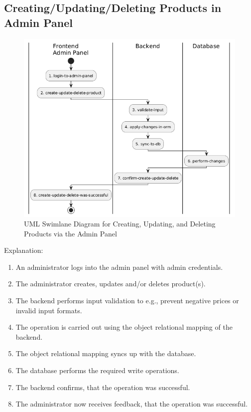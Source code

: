 \hypertarget{__runtime_scenario_3}{%
\subsection{Creating/Updating/Deleting Products in Admin Panel}\label{__runtime_scenario_3}}
\begin{figure}[h]
  \centering
  \includegraphics[width=\textwidth]{images/uml_swimlane_product_create_update_delete.png}
  \caption{UML Swimlane Diagram for Creating, Updating, and Deleting Products via the Admin Panel}
\end{figure}

Explanation:
\begin{enumerate}
  \item An administrator logs into the admin panel with admin credentials.
  \item The administrator creates, updates and/or deletes product(s).
  \item The backend performs input validation to e.g., prevent negative prices or invalid input formats.
  \item The operation is carried out using the object relational mapping of the backend.
  \item The object relational mapping syncs up with the database.
  \item The database performs the required write operations.
  \item The backend confirms, that the operation was successful.
  \item The administrator now receives feedback, that the operation was successful.
\end{enumerate}
